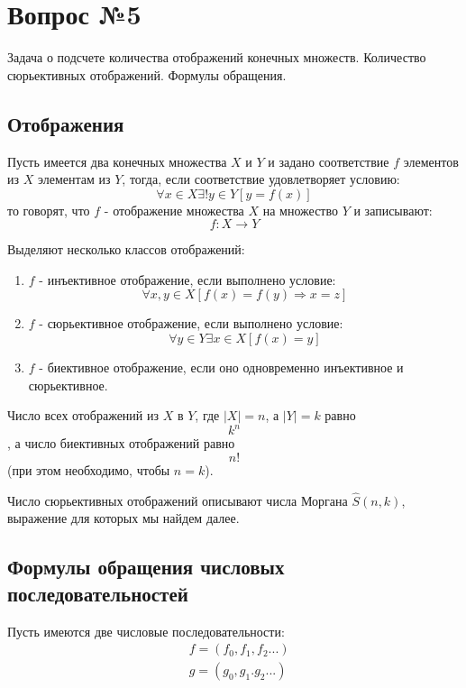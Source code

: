 \chapter{Вопрос №5}

Задача о подсчете количества отображений конечных множеств. Количество сюрьективных отображений. Формулы обращения.

\section{Отображения}

Пусть имеется два конечных множества $X$ и $Y$ и задано соответствие $f$ элементов из $X$ элементам из $Y$, тогда, если соответствие удовлетворяет условию:
\[
	\forall x \in X \exists! y \in Y \left[y = f\left(x\right)\right]
\]
то говорят, что $f$ - отображение множества $X$ на множество $Y$ и записывают:
\[
	f: X \rightarrow Y
\]

Выделяют несколько классов отображений:
\begin{enumerate}
\item $f$ - инъективное отображение, если выполнено условие:
\[
	\forall x,y \in X \left[f\left(x\right) = f\left(y\right) \Rightarrow x = z\right]
\]

\item $f$ - сюрьективное отображение, если выполнено условие:
\[
	\forall y \in Y \exists x \in X \left[f\left(x\right) = y\right]
\]

\item $f$ - биективное отображение, если оно одновременно инъективное и сюрьективное.

\end{enumerate}

Число всех отображений из $X$ в $Y$, где $\left|X\right| = n$, а $\left|Y\right| = k$ равно $$ k^n $$, а число биективных отображений равно $$ n! $$ (при этом необходимо, чтобы $n = k$).

Число сюрьективных отображений описывают числа Моргана $\hat S\left(n,k\right)$, выражение для которых мы найдем далее.

\section{Формулы обращения числовых последовательностей}

Пусть имеются две числовые последовательности:
\[
	\begin{split}
		& f = \left(f_0, f_1, f_2 ...\right) \\
		& g = \left(g_0, g_1. g_2 ...\right)
	\end{split}
\]

